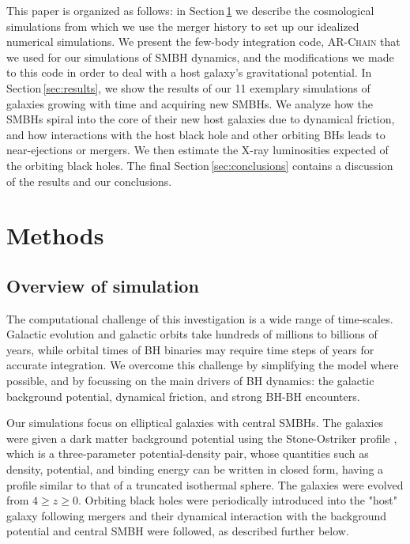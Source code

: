 \documentclass[fleqn,usenatbib,useAMS]{mnras}
\begin{document}
This paper is organized as follows: in Section\,\ref{sec:methods} we describe the cosmological simulations from which we use the merger history to set up our idealized numerical simulations. We present the few-body integration code, \textsc{AR-Chain} that we used for our simulations of SMBH dynamics, and the modifications we made to this code in order to deal with a host galaxy's gravitational potential. In Section\,\ref{sec:results}, we show the results of our 11 exemplary simulations of galaxies growing with time and acquiring new SMBHs. We analyze how the SMBHs spiral into the core of their new host galaxies due to dynamical friction, and how interactions with the host black hole and other orbiting BHs leads to near-ejections or mergers. We then estimate the X-ray luminosities expected of the orbiting black holes.  The final Section\,\ref{sec:conclusions} contains a discussion of the results and our conclusions.

\section{Methods}\label{sec:methods}


\subsection{Overview of simulation}
The computational challenge of this investigation is a wide range of time-scales. Galactic evolution and galactic orbits take hundreds of millions to billions of years, while orbital times of BH binaries may require time steps of years for accurate integration. We overcome this challenge by simplifying the model where possible, and by focussing on the main drivers of BH dynamics: the galactic background potential, dynamical friction, and strong BH-BH encounters.

Our simulations focus on elliptical galaxies with central SMBHs. The galaxies were given a dark matter background potential using the Stone-Ostriker profile \citep{2015ApJ...806L..28S}, which is a three-parameter potential-density pair, whose quantities such as density, potential, and binding energy can be written in closed form, having a profile similar to that of a truncated isothermal sphere.  The galaxies were evolved from $4\geq z \geq 0$.  Orbiting black holes were periodically introduced into the "host" galaxy following mergers and their dynamical interaction with the background potential and central SMBH were followed, as described further below.
\end{document}
